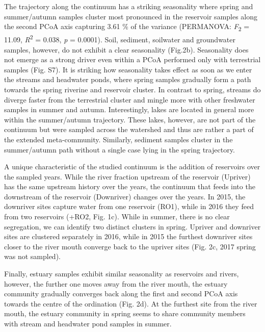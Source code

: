\documentclass[12pt,a4paper]{article} %
\begin{document}
The trajectory along the continuum has a striking seasonality where spring and summer/autumn samples cluster most pronounced in the reservoir samples along the second PCoA axis capturing 3.61 \% of the variance (PERMANOVA: \textit{F}\textsubscript{2} = 11.09, \textit{R}\textsuperscript{2} = 0.038, \textit{p} = 0.0001). Soil, sediment, soilwater and groundwater samples, however, do not exhibit a clear seasonality (Fig.2b). Seasonality does not emerge as a strong driver even within a PCoA performed only with terrestrial samples (Fig. S7). It is striking how seasonality takes effect as soon as we enter the streams and headwater ponds, where spring samples gradually form a path towards the spring riverine and reservoir cluster. In contrast to spring, streams do diverge faster from the terrestrial cluster and mingle more with other freshwater samples in summer and autumn. Interestingly, lakes are located in general more within the summer/autumn trajectory. These lakes, however, are not part of the continuum but were sampled across the watershed and thus are rather a part of the extended meta-community. Similarly, sediment samples cluster in the summer/autumn path without a single case lying in the spring trajectory.

A unique characteristic of the studied continuum is the addition of reservoirs over the sampled years. While the river fraction upstream of the reservoir (Upriver) has the same upstream history over the years, the continuum that feeds into the downstream of the reservoir (Downriver) changes over the years. In 2015, the downriver sites capture water from one reservoir (RO1), while in 2016 they feed from two reservoirs (+RO2, Fig. 1c). While in summer, there is no clear segregation, we can identify two distinct clusters in spring. Upriver and downriver sites are clustered separately in 2016, while in 2015 the furthest downriver sites closer to the river mouth converge back to the upriver sites (Fig. 2c, 2017 spring was not sampled).

Finally, estuary samples exhibit similar seasonality as reservoirs and rivers, however, the further one moves away from the river mouth, the estuary community gradually converges back along the first and second PCoA axis towards the centre of the ordination (Fig. 2d). At the furthest site from the river mouth, the estuary community in spring seems to share community members with stream and headwater pond samples in summer.
\end{document}
